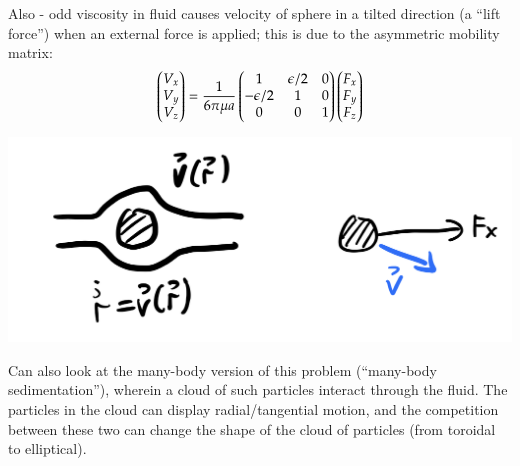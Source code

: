 Also - odd viscosity in fluid causes velocity of sphere in a tilted direction (a ``lift force'') when an external force is applied; this is due to the asymmetric mobility matrix:
\begin{equation}
    \begin{pmatrix}V_x \\ V_y \\ V_z\end{pmatrix} = \frac{1}{6\pi\mu a}\begin{pmatrix}1 & \epsilon/2 & 0 \\ -\epsilon/2 & 1 & 0 \\ 0 & 0 & 1\end{pmatrix}\begin{pmatrix}F_x \\ F_y \\ F_z\end{pmatrix}
\end{equation}

\begin{center}
    \includegraphics[scale=0.35]{Lectures/Images/lec12-liftforce.png}
\end{center}

Can also look at the many-body version of this problem (``many-body sedimentation''), wherein a cloud of such particles interact through the fluid. The particles in the cloud can display radial/tangential motion, and the competition between these two can change the shape of the cloud of particles (from toroidal to elliptical).